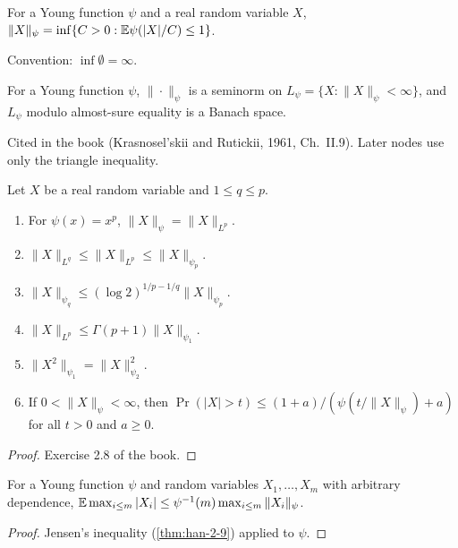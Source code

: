 \begin{definition}
  \label{def:han-2-10}
  For a Young function $\psi$ and a real random variable $X$,
  $\|X\|_\psi=\inf\{C>0:\mathbb{E}\psi(|X|/C)\le1\}$.
\end{definition}
\begin{remark}
  Convention: $\inf\emptyset=\infty$.
\end{remark}

\begin{theorem}
  \label{thm:han-2-10}
  For a Young function $\psi$, $\|\cdot\|_\psi$ is a seminorm on $L_\psi=\{X:\|X\|_\psi<\infty\}$, and $L_\psi$ modulo almost-sure equality is a Banach space.
\end{theorem}
\begin{remark}
  Cited in the book (Krasnosel'skii and Rutickii, 1961, Ch.~II.9). Later nodes use only the triangle inequality.
\end{remark}

\begin{proposition}
  \label{prop:han-2-4}
  Let $X$ be a real random variable and $1\le q\le p$.
  \begin{enumerate}
    \item[(i)] For $\psi(x)=x^p$, $\|X\|_\psi=\|X\|_{L^p}$.
    \item[(ii)] $\|X\|_{L^q}\le\|X\|_{L^p}\le\|X\|_{\psi_p}$.
    \item[(iii)] $\|X\|_{\psi_q}\le(\log2)^{1/p-1/q}\|X\|_{\psi_p}$.
    \item[(iv)] $\|X\|_{L^p}\le\Gamma(p+1)\|X\|_{\psi_1}$.
    \item[(v)] $\|X^2\|_{\psi_1}=\|X\|_{\psi_2}^2$.
    \item[(vi)] If $0<\|X\|_\psi<\infty$, then $\Pr(|X|>t)\le(1+a)/(\psi(t/\|X\|_\psi)+a)$ for all $t>0$ and $a\ge0$.
  \end{enumerate}
\end{proposition}
\begin{proof}
  Exercise 2.8 of the book.
\end{proof}

\begin{lemma}
  \label{lem:han-2-1}
  For a Young function $\psi$ and random variables $X_1,\dots,X_m$ with arbitrary dependence,
  $\mathbb{E}\max_{i\le m}|X_i|\le\psi^{-1}(m)\max_{i\le m}\|X_i\|_\psi$.
\end{lemma}
\begin{proof}
  Jensen's inequality (\cref{thm:han-2-9}) applied to $\psi$.
\end{proof}

